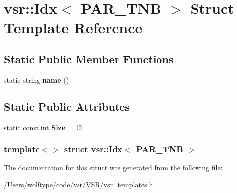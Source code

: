 \hypertarget{structvsr_1_1_idx_3_01_p_a_r___t_n_b_01_4}{\section{vsr\-:\-:Idx$<$ P\-A\-R\-\_\-\-T\-N\-B $>$ Struct Template Reference}
\label{structvsr_1_1_idx_3_01_p_a_r___t_n_b_01_4}
}
\subsection*{Static Public Member Functions}
\begin{DoxyCompactItemize}
\item 
\hypertarget{structvsr_1_1_idx_3_01_p_a_r___t_n_b_01_4_ad39dc1354b7e40cd1d737e7ddf0a251e}{static string {\bfseries name} ()}\label{structvsr_1_1_idx_3_01_p_a_r___t_n_b_01_4_ad39dc1354b7e40cd1d737e7ddf0a251e}

\end{DoxyCompactItemize}
\subsection*{Static Public Attributes}
\begin{DoxyCompactItemize}
\item 
\hypertarget{structvsr_1_1_idx_3_01_p_a_r___t_n_b_01_4_a43d136d9a7deef21f77f56da25fcd7e9}{static const int {\bfseries Size} = 12}\label{structvsr_1_1_idx_3_01_p_a_r___t_n_b_01_4_a43d136d9a7deef21f77f56da25fcd7e9}

\end{DoxyCompactItemize}
\subsubsection*{template$<$$>$ struct vsr\-::\-Idx$<$ P\-A\-R\-\_\-\-T\-N\-B $>$}



The documentation for this struct was generated from the following file\-:\begin{DoxyCompactItemize}
\item 
/\-Users/wolftype/code/vsr/\-V\-S\-R/vsr\-\_\-templates.\-h\end{DoxyCompactItemize}
